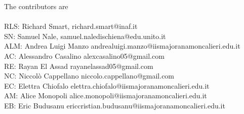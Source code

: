 \clearpage

The contributors are\\\\
RLS: Richard Smart, richard.smart@inaf.it\\
SN: Samuel Nale, samuel.naledischiena@edu.unito.it\\
ALM: Andrea Luigi Manzo andrealuigi.manzo@iismajoranamoncalieri.edu.it\\
AC: Alessandro Casalino alexcasalino05@gmail.com\\
RE: Rayan El Assad rayanelassad05@gmail.com\\ 
NC: Niccolò Cappellano niccolo.cappellano@gmail.com\\
EC: Elettra Chiofalo elettra.chiofalo@iismajoranamoncalieri.edu.it\\
AM: Alice Monopoli alice.monopoli@iismajoranamoncalieri.edu.it\\
EB: Eric Budusanu ericcristian.budusanu@iismajoranamoncalieri.edu.it\\
